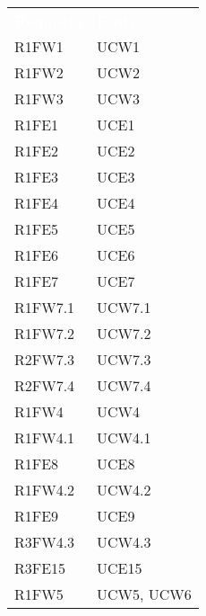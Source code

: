 \begin{table}[!htbp]
\renewcommand{\arraystretch}{1.5}
\begin{tabular}[t]{ m{}<{\centering}  m{}<{\centering} }
	\rowcolor{darkblue}
	\textcolor{white}{\textbf{Requisito}} &\textcolor{white}{\textbf{Fonti}}\\ 	
	 
	R1FW1 & UCW1 \\	
	 
	R1FW2 & UCW2\\	

	R1FW3 & UCW3\\	
	 
	R1FE1 & UCE1\\	
	 
 	R1FE2 & UCE2\\	
	 
	R1FE3 & UCE3\\	

	R1FE4 & UCE4\\	
	
	R1FE5 & UCE5 \\
	 
	R1FE6 & UCE6 \\	 
	 
	R1FE7 & UCE7\\	
	
	R1FW7.1 & UCW7.1 \\

	R1FW7.2 & UCW7.2 \\
	
	R2FW7.3 & UCW7.3 \\
	
	R2FW7.4 & UCW7.4 \\	

	R1FW4 & UCW4 \\ 
	 
	R1FW4.1 & UCW4.1\\	
	 
	R1FE8 & UCE8\\	
	 
	R1FW4.2 & UCW4.2\\		 

	R1FE9 & UCE9 \\		
	 
	R3FW4.3 & UCW4.3\\				
	 
	R3FE15 & UCE15\\			
	  	 	 	
	R1FW5 & UCW5, UCW6\\		
	 

\end{tabular}
\end{table}
